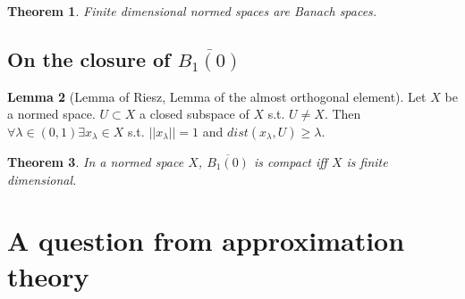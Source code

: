 \documentclass[a4paper, 12pt]{article}
\theoremstyle{plain}
\newtheorem{theorem}{Theorem}[subsection] %
\theoremstyle{definition}
\theoremstyle{lemma}
\newtheorem{lemma}[theorem]{Lemma}
\theoremstyle{remark}
\theoremstyle{corollary}
\theoremstyle{example}
\begin{document}
	\begin{theorem}
		Finite dimensional normed spaces are Banach spaces.
	\end{theorem}
	
	\subsection{On the closure of $\overline{B_1(0)}$}
	\begin{lemma}[Lemma of Riesz, Lemma of the almost orthogonal element]
		Let $X$ be a normed space. $U \subset X$ a closed subspace of $X$ s.t. $U \neq X$. Then $\forall \lambda \in (0,1) \exists x_\lambda \in X$ s.t. $||x_\lambda|| = 1$ and $dist(x_\lambda, U) \geq \lambda$.
	\end{lemma}
	\begin{theorem}
		In a normed space $X$, $\overline{B_1(0)}$ is compact iff $X$ is finite dimensional.
	\end{theorem}
	
	\section{A question from approximation theory}
\end{document}
